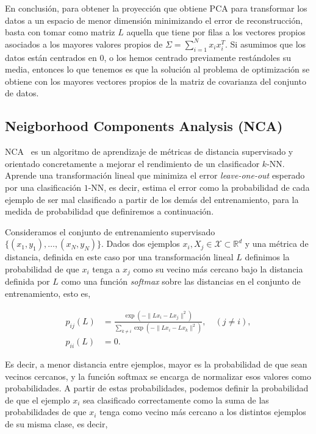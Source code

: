 En conclusión, para obtener la proyección que obtiene PCA para transformar los datos a un espacio de menor dimensión minimizando el error de reconstrucción, basta con tomar como matriz $L$ aquella que tiene por filas a los vectores propios asociados a los mayores valores propios de $\Sigma = \sum_{i=1}^Nx_ix_i^T$. Si asumimos que los datos están centrados en 0, o los hemos centrado previamente restándoles su media, entonces lo que tenemos es que la solución al problema de optimización se obtiene con los mayores vectores propios de la matriz de covarianza del conjunto de datos.

\subsection{Neigborhood Components Analysis (NCA)}

NCA~\parencite{goldberger2004neighbourhood} es un algoritmo de aprendizaje de métricas de distancia supervisado y orientado concretamente a mejorar el rendimiento de un clasificador $k$-NN. Aprende una transformación lineal que minimiza el error \emph{leave-one-out} esperado por una clasificación $1$-NN, es decir, estima el error como la probabilidad de cada ejemplo de ser mal clasificado a partir de los demás del entrenamiento, para la medida de probabilidad que definiremos a continuación.

Consideramos el conjunto de entrenamiento supervisado $\{(x_1, y_1), \dots, (x_N, y_N)\}$. Dados dos ejemplos $x_i, X_j \in \mathcal{X} \subset \mathbb{R}^d$ y una métrica de distancia, definida en este caso por una transformación lineal $L$ definimos la probabilidad de que $x_i$ tenga a $x_j$ como su vecino más cercano bajo la distancia definida por $L$ como una función \emph{softmax} sobre las distancias en el conjunto de entrenamiento, esto es,

\begin{align*}
    p_{ij}(L) &= \frac{\exp(-\|Lx_i - Lx_j\|^2)}{\sum_{k \ne i}\exp(-\|Lx_i - Lx_k\|^2)}, \quad (j \ne i), \\
    p_{ii}(L) &= 0.
\end{align*}

Es decir, a menor distancia entre ejemplos, mayor es la probabilidad de que sean vecinos cercanos, y la función softmax se encarga de normalizar esos valores como probabilidades. A partir de estas probabilidades, podemos definir la probabilidad de que el ejemplo $x_i$ sea clasificado correctamente como la suma de las probabilidades de que $x_i$ tenga como vecino más cercano a los distintos ejemplos de su misma clase, es decir,

